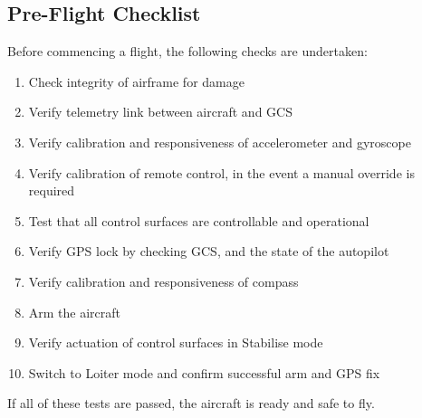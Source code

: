 \clearpage
\subsection{Pre-Flight Checklist}
Before commencing a flight, the following checks are undertaken:
\begin{enumerate}
	\item Check integrity of airframe for damage
	\item Verify telemetry link between aircraft and GCS
	\item Verify calibration and responsiveness of accelerometer and gyroscope
	\item Verify calibration of remote control, in the event a manual override is required
	\item Test that all control surfaces are controllable and operational
	\item Verify GPS lock by checking GCS, and the state of the autopilot
	\item Verify calibration and responsiveness of compass
	\item Arm the aircraft
	\item Verify actuation of control surfaces in Stabilise mode
	\item Switch to Loiter mode and confirm successful arm and GPS fix
\end{enumerate} 

If all of these tests are passed, the aircraft is ready and safe to fly.